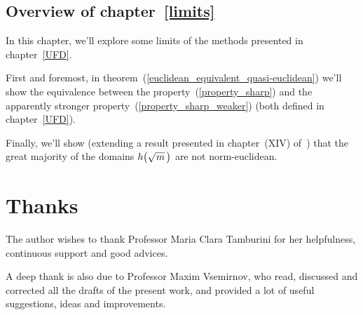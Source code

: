 \subsection*{Overview of chapter~\ref{limits}}
%
In this chapter, we'll explore some limits of the methods presented in
chapter~\ref{UFD}.

First and foremost, in theorem~(\ref{euclidean_equivalent_quasi-euclidean})
we'll show the equivalence between the property~(\ref{property_sharp})
and the apparently stronger property~(\ref{property_sharp_weaker})
(both defined in chapter~\ref{UFD}).

Finally, we'll show (extending a result presented in
chapter~{\small (XIV)} of~\cite{H&W}) that the great majority of
the domains $\hh{m}$ are not norm-euclidean.

\section{Thanks}

The author wishes to thank Professor Maria Clara Tamburini for her
helpfulness, continuous support and good advices.

A deep thank is also due to Professor Maxim Vsemirnov, who read, discussed
and corrected all the drafts of the present work, and provided a lot of
useful suggestions, ideas and improvements.
